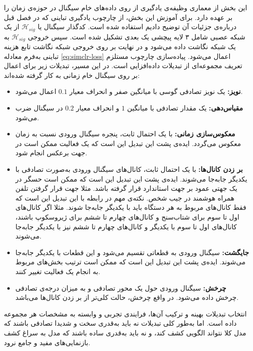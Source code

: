 این بخش از معماری وظیفه‌ی یادگیری از روی داده‌های خام سیگنال در حوزه‌ی زمان را بر عهده دارد. برای آموزش این بخش، از چارچوب یادگیری تباینی
که در فصل قبل درباره‌ی جزئیات آن توضیح دادیم استفاده شده است. کدگذار سیگنال یا
$\mathcal{H}_{sig}$
از یک شبکه عصبی شامل ۳ لایه پیچشی یک بعدی تشکیل شده است. سپس خروجی $\mathcal{H}_{sig}$
به یک شبکه نگاشت داده می‌شود و در نهایت بر روی خروجی شبکه نگاشت تابع هزینه تباینی  به‌فرم معادله \ref{eq:simclr-loss}
اعمال می‌شود.
پیاده‌سازی چارچوب  مستلزم تعریف مجموعه‌ای از تبدیلات داده‌افزایی است. در این مسیر، تبدیلات زیر برای اعمال بر روی سیگنال خام زمانی به کار گرفته شده‌اند:
\begin{itemize}
    \item\textbf{نویز:} یک نویز تصادفی گوسی با میانگین صفر و انحراف معیار $0.1$ اعمال می‌شود.
    \item\textbf{مقیاس‌دهی:}
    یک مقدار تصادفی با میانگین $1$ و انحراف معیار $0.2$ در سیگنال ضرب می‌شود.
    \item\textbf{معکوس‌سازی زمانی:}
    با یک احتمال ثابت، پنجره سیگنال ورودی نسبت به زمان معکوس می‌گردد. ایده‌ی پشت این تبدیل این است که یک فعالیت ممکن است در جهت برعکس انجام شود.
    \item\textbf{بر زدن کانال‌ها:}
    با یک احتمال ثابت، کانال‌های سیگنال ورودی به‌صورت تصادفی با یکدیگر جابه‌جا می‌شوند. ایده‌ی پشت این تبدیل این است که ممکن است حسگر در یک جهتی عمود بر جهت استاندارد قرار گرفته باشد. مثلا جهت قرار گرفتن تلفن همراه هوشمند در جیب شخص. نکته‌ی مهم در رابطه با این تبدیل این است که فقط کانال‌های مربوط به هر دستگاه باید با یکدیگر جابه‌جا شوند. مثلا اگر کانال‌های اول تا سوم برای شتاب‌سنج و کانال‌های چهارم تا ششم برای ژیروسکوپ باشند، کانال‌های اول تا سوم با یکدیگر و کانال‌های چهارم تا ششم نیز با یکدیگر جابه‌جا می‌شوند.
    \item\textbf{جایگشت:} سیگنال ورودی به قطعاتی تقسیم می‌شود و این قطعات با یکدیگر جابه‌جا می‌شوند. ایده‌ی پشت این تبدیل این است که ممکن است ترتیب بخش‌های مربوط به انجام یک فعالیت تغییر کنند.
    \item\textbf{چرخش:}
    سیگنال ورودی حول یک محور تصادفی و به میزان درجه‌ی تصادفی چرخش داده می‌شود. در واقع چرخش، حالت کلی‌تر از بر زدن کانال‌ها می‌باشد.
\end{itemize}

انتخاب تبدیلات بهینه و ترکیب آن‌ها، فرایندی تجربی و وابسته به مشخصات هر مجموعه داده است. اما به‌طور کلی تبدیلات نه باید به‌قدری سخت و شدیدا تصادفی باشند که مدل کلا نتواند الگویی کشف کند، و نه باید به‌قدری ساده باشند که مدل به سراغ کشف بازنمایی‌های مفید و جامع نرود.

